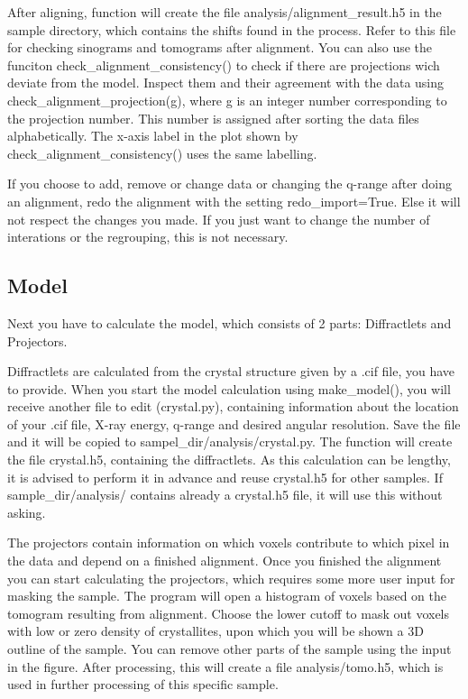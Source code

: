 After aligning, function will create the file analysis/alignment\_result.h5 in the sample directory, which contains the shifts found
in the process. Refer to this file for checking sinograms and tomograms after alignment.
You can also use the funciton check\_alignment\_consistency() to check if there are projections wich deviate from the
model. Inspect them and their agreement with the data using check\_alignment\_projection(g), where g is an integer number
corresponding to the projection number. This number is assigned after sorting the data files alphabetically.
The x-axis label in the plot shown by check\_alignment\_consistency() uses the same labelling.

If you choose to add, remove or change data or changing the q-range after doing an alignment, redo the alignment with the
setting redo\_import=True.
Else it will not respect the changes you made. If you just want to change the number of interations or the regrouping,
this is not necessary.

\subsection{Model}
Next you have to calculate the model, which consists of 2 parts: Diffractlets and Projectors.

Diffractlets are calculated from the crystal structure given by a .cif file, you have to provide.
When you start the model calculation using make\_model(), you will receive another file to edit (crystal.py), containing
information about the location of your .cif file, X-ray energy, q-range and desired angular resolution.
Save the file and it will be copied to sampel\_dir/analysis/crystal.py.
The function will create the file crystal.h5, containing the diffractlets. As this calculation can be lengthy,
it is advised to perform it in advance and reuse crystal.h5 for other samples. If sample\_dir/analysis/ contains
already a crystal.h5 file, it will use this without asking.

The projectors contain information on which voxels contribute to which pixel in the data and
depend on a finished alignment. Once you finished the alignment you can start calculating the projectors,
which requires some more user input for masking the sample. The program will open a histogram of voxels based on the
tomogram resulting from alignment. Choose the lower cutoff to mask out voxels with low or zero density of crystallites,
upon which you will be shown a 3D outline of the sample.
You can remove other parts of the sample using the input in the figure.
After processing, this will create a file analysis/tomo.h5, which is used in further processing of this specific sample.

